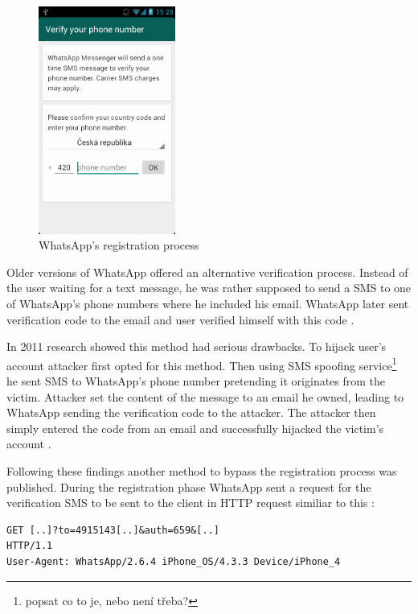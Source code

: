 \documentclass[thesis=M,english]{FITthesis}[2012/10/20]
\begin{document}
\begin{figure}[htb]
	\centering
	\includegraphics[width=0.4\textwidth]{whatsapp-registration.png}
	\caption{WhatsApp's registration process}
	\label{img:whatsapp_reg}
\end{figure}

Older versions of WhatsApp offered an alternative verification process. Instead of the user waiting for a text message, he was rather supposed to send a SMS to one of WhatsApp's phone numbers where he included his email. WhatsApp later sent verification code to the email and user verified himself with this code \cite{whatsapp-shootingthemsg}.

In 2011 research showed this method had serious drawbacks. To hijack user's account attacker first opted for this method. Then using SMS spoofing service\footnote{popsat co to je, nebo není třeba?} he sent SMS to WhatsApp's phone number pretending it originates from the victim. Attacker set the content of the message to an email he owned, leading to WhatsApp sending the verification code to the attacker. The attacker then simply entered the code from an email and successfully hijacked the victim's account \cite{whatsapp-hijack1}.

Following these findings another method to bypass the registration process was published. During the registration phase WhatsApp sent a request for the verification SMS to be sent to the client in HTTP request similiar to this \cite{whatsapp-shootingthemsg}:


\begin{lstlisting}[caption={HTTP request to dispatch SMS}]
GET [..]?to=4915143[..]&auth=659&[..]
HTTP/1.1
User-Agent: WhatsApp/2.6.4 iPhone_OS/4.3.3 Device/iPhone_4
\end{lstlisting}
\end{document}
